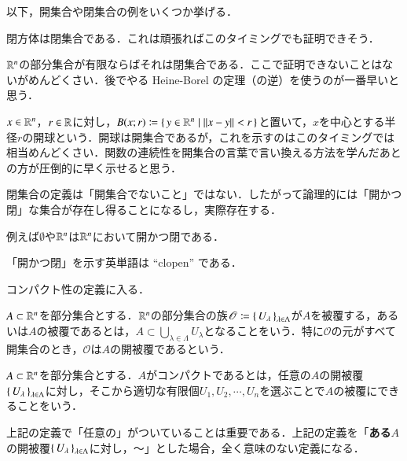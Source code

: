 以下，開集合や閉集合の例をいくつか挙げる．

\begin{que}
閉方体は閉集合である．これは頑張ればこのタイミングでも証明できそう．
\end{que}

\begin{que}
$\mathbb{R}^n$の部分集合が有限ならばそれは閉集合である．ここで証明できないことはないがめんどくさい．後でやる Heine-Borel の定理（の逆）を使うのが一番早いと思う．
\end{que}

\begin{que}
$x\in \mathbb{R}^n$，$r \in \mathbb{R}$に対し，$B(x;r) \coloneqq \set{y \in \mathbb{R}^n | \|x-y\| < r}$と置いて，$x$を中心とする半径$r$の開球という．開球は開集合であるが，これを示すのはこのタイミングでは相当めんどくさい．関数の連続性を開集合の言葉で言い換える方法を学んだあとの方が圧倒的に早く示せると思う．
\end{que}

閉集合の定義は「開集合でないこと」ではない．したがって論理的には「開かつ閉」な集合が存在し得ることになるし，実際存在する．

\begin{que}
例えば$\emptyset$や$\mathbb{R}^n$は$\mathbb{R}^n$において開かつ閉である．
\end{que}

\begin{dig}
「開かつ閉」を示す英単語は ``clopen'' である．
\end{dig}

コンパクト性の定義に入る．

\begin{defi}
$A \subset \mathbb{R}^n$を部分集合とする．$\mathbb{R}^n$の部分集合の族$\mathscr{O} \coloneqq \set{U_\lambda}_{\lambda \in \Lambda}$が$A$を被覆する，あるいは$A$の被覆であるとは，$A \subset \bigcup_{\lambda \in \Lambda} U_\lambda$となることをいう．特に$\mathscr{O}$の元がすべて開集合のとき，$\mathscr{O}$は$A$の開被覆であるという．
\end{defi}

\begin{defi}
$A \subset \mathbb{R}^n$を部分集合とする．$A$がコンパクトであるとは，任意の$A$の開被覆$\set{U_\lambda}_{\lambda \in \Lambda}$に対し，そこから適切な有限個$U_1, U_2, \cdots, U_n$を選ぶことで$A$の被覆にできることをいう．
\end{defi}

\begin{que}
上記の定義で「任意の」がついていることは重要である．上記の定義を「{\bf ある}$A$の開被覆$\set{U_\lambda}_{\lambda \in \Lambda}$に対し，〜」とした場合，全く意味のない定義になる．
\end{que}

